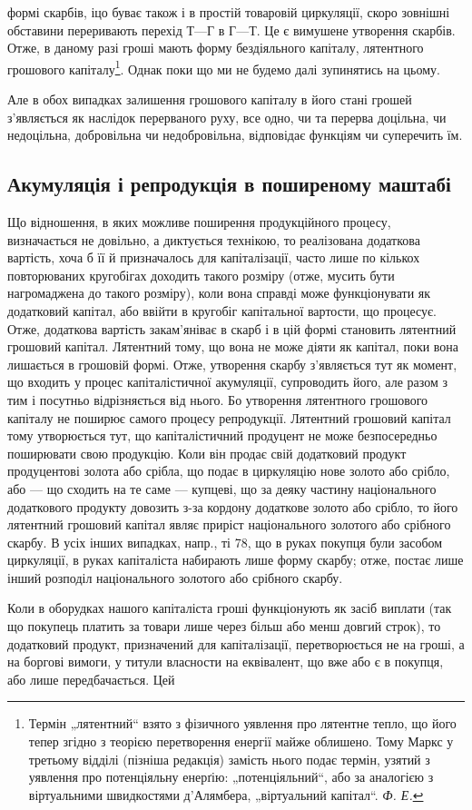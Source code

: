 \parcont{}  %
формі скарбів, іцо буває також і в простій товаровій циркуляції, скоро
зовнішні обставини переривають перехід $Т — Г$ в $Г — Т$. Це є вимушене
утворення скарбів. Отже, в даному разі гроші мають форму бездіяльного
капіталу, лятентного грошового капіталу\footnote{
Термін „лятентний“ взято з фізичного уявлення про лятентне тепло, що
його тепер згідно з теорією перетворення енергії майже облишено. Тому Маркс
у третьому відділі (пізніша редакція) замість нього подає термін, узятий з уявлення
про потенціяльну енерґію: „потенціяльний“, або за аналогією з віртуальними швидкостями
д’Алямбера, „віртуальний капітал“. \emph{Ф. Е.}
}. Однак поки що ми не будемо
далі зупинятись на цьому.

Але в обох випадках залишення грошового капіталу в його стані
грошей з’являється як наслідок перерваного руху, все одно, чи та перерва
доцільна, чи недоцільна, добровільна чи недобровільна, відповідає функціям
чи суперечить їм.

\subsection{Акумуляція і репродукція в поширеному маштабі}

Що відношення, в яких можливе поширення продукційного процесу,
визначається не довільно, а диктується технікою, то реалізована додаткова
вартість, хоча б її й призначалось для капіталізації, часто лише по
кількох повторюваних кругобігах доходить такого розміру (отже, мусить
бути нагромаджена до такого розміру), коли вона справді може функціонувати
як додатковий капітал, або ввійти в кругобіг капітальної вартости,
що процесує. Отже, додаткова вартість закам’яніває в скарб і в цій
формі становить лятентний грошовий капітал. Лятентний тому, що вона не
може діяти як капітал, поки вона лишається в грошовій формі. Отже,
утворення скарбу з’являється тут як момент, що входить у процес капіталістичної
акумуляції, супроводить його, але разом з тим і посутньо
відрізняється від нього. Бо утворення лятентного грошового капіталу
не поширює самого процесу репродукції. Лятентний грошовий
капітал тому утворюється тут, що капіталістичний продуцент не може
безпосередньо поширювати свою продукцію. Коли він продає свій додатковий
продукт продуцентові золота або срібла, що подає в циркуляцію
нове золото або срібло, або — що сходить на те саме — купцеві, що
за деяку частину національного додаткового продукту довозить
з-за кордону додаткове золото або срібло, то його лятентний грошовий
капітал являє приріст національного золотого або срібного скарбу. В усіх
інших випадках, напр., ті 78, що в руках покупця були засобом
циркуляції, в руках капіталіста набирають лише форму скарбу;
отже, постає лише інший розподіл національного золотого або срібного
скарбу.

Коли в оборудках нашого капіталіста гроші функціонують як засіб виплати
(так що покупець платить за товари лише через більш або менш довгий
строк), то додатковий продукт, призначений для капіталізації, перетворюється
не на гроші, а на боргові вимоги, у титули власности
на еквівалент, що вже або є в покупця, або лише передбачається. Цей
\parbreak{}  %
